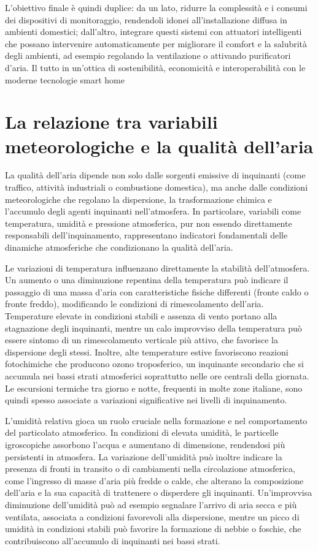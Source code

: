 \documentclass[fleqn,10pt]{SelfArx} %
\begin{document}
L’obiettivo finale è quindi duplice: da un lato, ridurre la complessità e i consumi dei dispositivi di monitoraggio, rendendoli idonei all’installazione diffusa in ambienti domestici; dall’altro, integrare questi sistemi con attuatori intelligenti che possano intervenire automaticamente per migliorare il comfort e la salubrità degli ambienti, ad esempio regolando la ventilazione o attivando purificatori d’aria. Il tutto in un’ottica di sostenibilità, economicità e interoperabilità con le moderne tecnologie smart home


\section{La relazione tra variabili meteorologiche e la qualità dell’aria}
La qualità dell’aria dipende non solo dalle sorgenti emissive di inquinanti (come traffico, attività industriali o combustione domestica), ma anche dalle condizioni meteorologiche che regolano la dispersione, la trasformazione chimica e l’accumulo degli agenti inquinanti nell’atmosfera. In particolare, variabili come temperatura, umidità e pressione atmosferica, pur non essendo direttamente responsabili dell’inquinamento, rappresentano indicatori fondamentali delle dinamiche atmosferiche che condizionano la qualità dell’aria.

Le variazioni di temperatura influenzano direttamente la stabilità dell’atmosfera. Un aumento o una diminuzione repentina della temperatura può indicare il passaggio di una massa d’aria con caratteristiche fisiche differenti (fronte caldo o fronte freddo), modificando le condizioni di rimescolamento dell’aria. Temperature elevate in condizioni stabili e assenza di vento portano alla stagnazione degli inquinanti, mentre un calo improvviso della temperatura può essere sintomo di un rimescolamento verticale più attivo, che favorisce la dispersione degli stessi.
Inoltre, alte temperature estive favoriscono reazioni fotochimiche che producono ozono troposferico, un inquinante secondario che si accumula nei bassi strati atmosferici soprattutto nelle ore centrali della giornata. Le escursioni termiche tra giorno e notte, frequenti in molte zone italiane, sono quindi spesso associate a variazioni significative nei livelli di inquinamento.

L’umidità relativa gioca un ruolo cruciale nella formazione e nel comportamento del particolato atmosferico. In condizioni di elevata umidità, le particelle igroscopiche assorbono l’acqua e aumentano di dimensione, rendendosi più persistenti in atmosfera. La variazione dell’umidità può inoltre indicare la presenza di fronti in transito o di cambiamenti nella circolazione atmosferica, come l’ingresso di masse d’aria più fredde o calde, che alterano la composizione dell’aria e la sua capacità di trattenere o disperdere gli inquinanti.
Un’improvvisa diminuzione dell’umidità può ad esempio segnalare l’arrivo di aria secca e più ventilata, associata a condizioni favorevoli alla dispersione, mentre un picco di umidità in condizioni stabili può favorire la formazione di nebbie o foschie, che contribuiscono all’accumulo di inquinanti nei bassi strati.
\end{document}
